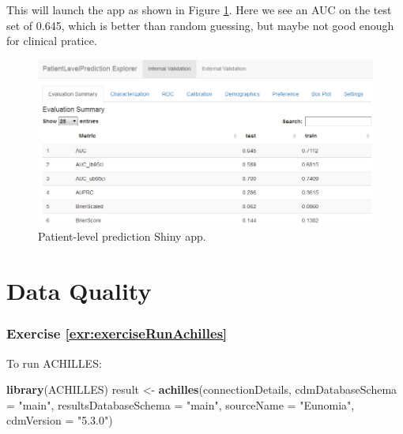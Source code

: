 \documentclass[11pt]{book}
\newenvironment{Shaded}{\begin{snugshade}}{\end{snugshade}}
\newcommand{\KeywordTok}[1]{\textcolor[rgb]{0.13,0.29,0.53}{\textbf{#1}}}
\newcommand{\DataTypeTok}[1]{\textcolor[rgb]{0.13,0.29,0.53}{#1}}
\newcommand{\StringTok}[1]{\textcolor[rgb]{0.31,0.60,0.02}{#1}}
\newcommand{\NormalTok}[1]{#1}
\theoremstyle{definition}
\theoremstyle{definition}
\theoremstyle{definition}
\theoremstyle{remark}
\begin{document}
This will launch the app as shown in Figure \ref{fig:plpShiny}. Here we
see an AUC on the test set of 0.645, which is better than random
guessing, but maybe not good enough for clinical pratice.

\begin{figure}

{\centering \includegraphics[width=1\linewidth]{images/SuggestedAnswers/plpShiny} 

}

\caption{Patient-level prediction Shiny app.}\label{fig:plpShiny}
\end{figure}

\section{Data Quality}\label{DataQualityanswers}

\subsubsection*{Exercise
\ref{exr:exerciseRunAchilles}}\label{exercise-refexrexerciserunachilles}

To run ACHILLES:

\begin{Shaded}
\begin{Highlighting}[]
\KeywordTok{library}\NormalTok{(ACHILLES)}
\NormalTok{result <-}\StringTok{ }\KeywordTok{achilles}\NormalTok{(connectionDetails,}
                   \DataTypeTok{cdmDatabaseSchema =} \StringTok{"main"}\NormalTok{,}
                   \DataTypeTok{resultsDatabaseSchema =} \StringTok{"main"}\NormalTok{,}
                   \DataTypeTok{sourceName =} \StringTok{"Eunomia"}\NormalTok{,}
                   \DataTypeTok{cdmVersion =} \StringTok{"5.3.0"}\NormalTok{)}
\end{Highlighting}
\end{Shaded}
\end{document}
